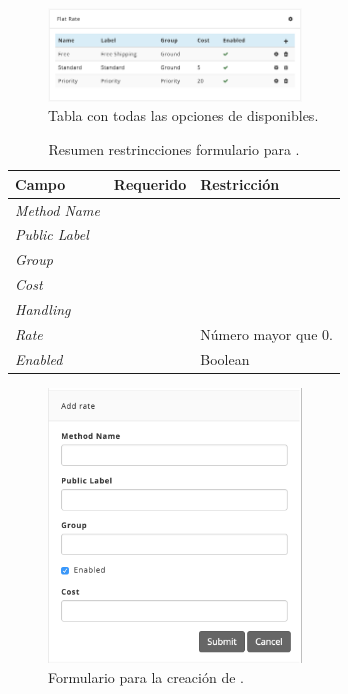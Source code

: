 
\begin{figure}[H]
	\centering
	\includegraphics[width=0.6\textwidth]{figuras/dashboard/shipping/shipping_options.png}
	\caption{Tabla con todas las opciones de \shippingEF disponibles.}
	\label{figure:dashboard:shipping:shipping_options}
\end{figure}

\begin{table}[H]
    \centering
	\begin{tabular}{ |l|c||l| }
		\hline Campo & Requerido & Restricción \\ \hline
		\multirow{1}{*}{\textit{Method Name}} 	&  \checkmark 	& \\ \hline
		\multirow{1}{*}{\textit{Public Label}} 	&  \checkmark	& \\ \hline
		\multirow{1}{*}{\textit{Group}} 		&  \checkmark	& \\ \hline
		\multirow{1}{*}{\textit{Cost}} 			&  				& \\ \hline
		\multirow{1}{*}{\textit{Handling}} 		&  				& \\ \hline
		\multirow{1}{*}{\textit{Rate}} 			&  \checkmark	& Número mayor que 0. \\ \hline
		\multirow{1}{*}{\textit{Enabled}} 		&  \checkmark	& Boolean \\ \hline
	\end{tabular}
 	\caption{Resumen restrincciones formulario para \shippingEF.}
    \label{tab:dashboard:shipping:form:restrictions:shipping}
\end{table}

\begin{figure}[H]
	\centering
	\includegraphics[width=0.6\textwidth]{figuras/dashboard/shipping/form_shipping_add.png}
	\caption{Formulario para la creación de \shippingEF.}
	\label{figure:dashboard:shipping:form_shipping_add}
\end{figure}



